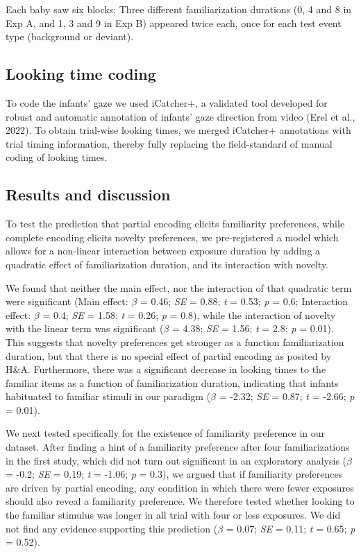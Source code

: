 \documentclass[10pt, letterpaper]{article}
\begin{document}
Each baby saw six blocks: Three different familiarization durations (0,
4 and 8 in Exp A, and 1, 3 and 9 in Exp B) appeared twice each, once for
each test event type (background or deviant).

\hypertarget{looking-time-coding}{%
\subsection{Looking time coding}\label{looking-time-coding}}

To code the infants' gaze we used iCatcher+, a validated tool developed
for robust and automatic annotation of infants' gaze direction from
video (Erel et al., 2022). To obtain trial-wise looking times, we merged
iCatcher+ annotations with trial timing information, thereby fully
replacing the field-standard of manual coding of looking times.

\hypertarget{results-and-discussion-1}{%
\subsection{Results and discussion}\label{results-and-discussion-1}}

To test the prediction that partial encoding elicits familiarity
preferences, while complete encoding elicits novelty preferences, we
pre-registered a model which allows for a non-linear interaction between
exposure duration by adding a quadratic effect of familiarization
duration, and its interaction with novelty.

We found that neither the main effect, nor the interaction of that
quadratic term were significant (Main effect: \(\beta\) = 0.46;
\emph{SE} = 0.88; \emph{t} = 0.53; \emph{p} = 0.6; Interaction effect:
\(\beta\) = 0.4; \emph{SE} = 1.58; \emph{t} = 0.26; \emph{p} = 0.8),
while the interaction of novelty with the linear term was significant
(\(\beta\) = 4.38; \emph{SE} = 1.56; \emph{t} = 2.8; \emph{p} = 0.01).
This suggests that novelty preferences get stronger as a function
familiarization duration, but that there is no special effect of partial
encoding as posited by H\&A. Furthermore, there was a significant
decrease in looking times to the familiar items as a function of
familiarization duration, indicating that infants habituated to familiar
stimuli in our paradigm (\(\beta\) = -2.32; \emph{SE} = 0.87; \emph{t} =
-2.66; \emph{p} = 0.01).

We next tested specifically for the existence of familiarity preference
in our dataset. After finding a hint of a familiarity preference after
four familiarizations in the first study, which did not turn out
significant in an exploratory analysis (\(\beta\) = -0.2; \emph{SE} =
0.19; \emph{t} = -1.06; \emph{p} = 0.3), we argued that if familiarity
preferences are driven by partial encoding, any condition in which there
were fewer exposures should also reveal a familiarity preference. We
therefore tested whether looking to the familiar stimulus was longer in
all trial with four or less exposures. We did not find any evidence
supporting this prediction (\(\beta\) = 0.07; \emph{SE} = 0.11; \emph{t}
= 0.65; \emph{p} = 0.52).
\end{document}
